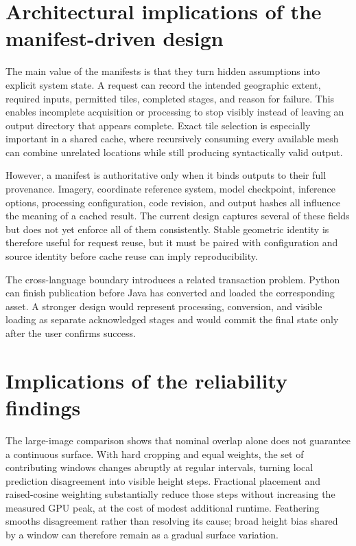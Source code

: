 \section{Architectural implications of the manifest-driven design}

The main value of the manifests is that they turn hidden assumptions into
explicit system state.  A request can record the intended geographic extent,
required inputs, permitted tiles, completed stages, and reason for failure.
This enables incomplete acquisition or processing to stop visibly instead of
leaving an output directory that appears complete.  Exact tile selection is
especially important in a shared cache, where recursively consuming every
available mesh can combine unrelated locations while still producing
syntactically valid output.

However, a manifest is authoritative only when it binds outputs to their full
provenance.  Imagery, coordinate reference system, model checkpoint,
inference options, processing configuration, code revision, and output hashes
all influence the meaning of a cached result.  The current design captures
several of these fields but does not yet enforce all of them consistently.
Stable geometric identity is therefore useful for request reuse, but it must be
paired with configuration and source identity before cache reuse can imply
reproducibility.

The cross-language boundary introduces a related transaction problem.  Python
can finish publication before Java has converted and loaded the corresponding
asset. A stronger design would represent processing, conversion, and
visible loading as separate acknowledged stages and would commit the final
state only after the user confirms success.

\section{Implications of the reliability findings}

The large-image comparison shows that nominal overlap alone does not guarantee
a continuous surface.  With hard cropping and equal weights, the set of
contributing windows changes abruptly at regular intervals, turning local
prediction disagreement into visible height steps.  Fractional placement and
raised-cosine weighting substantially reduce those steps without increasing
the measured GPU peak, at the cost of modest additional runtime.  Feathering
smooths disagreement rather than resolving its cause; broad height bias shared
by a window can therefore remain as a gradual surface variation.

